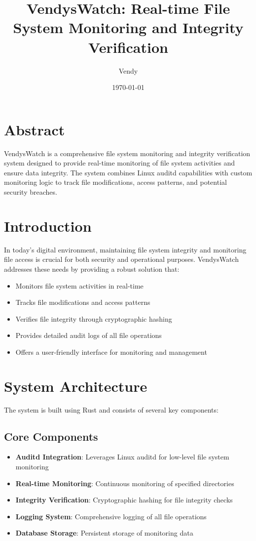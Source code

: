 \documentclass[12pt]{article}
\title{VendysWatch: Real-time File System Monitoring and Integrity Verification}
\author{Vendy}
\date{\today}
\begin{document}
\maketitle

\section{Abstract}
VendysWatch is a comprehensive file system monitoring and integrity verification system designed to provide real-time monitoring of file system activities and ensure data integrity. The system combines Linux auditd capabilities with custom monitoring logic to track file modifications, access patterns, and potential security breaches.

\section{Introduction}
In today's digital environment, maintaining file system integrity and monitoring file access is crucial for both security and operational purposes. VendysWatch addresses these needs by providing a robust solution that:

\begin{itemize}
    \item Monitors file system activities in real-time
    \item Tracks file modifications and access patterns
    \item Verifies file integrity through cryptographic hashing
    \item Provides detailed audit logs of all file operations
    \item Offers a user-friendly interface for monitoring and management
\end{itemize}

\section{System Architecture}
The system is built using Rust and consists of several key components:

\subsection{Core Components}
\begin{itemize}
    \item \textbf{Auditd Integration}: Leverages Linux auditd for low-level file system monitoring
    \item \textbf{Real-time Monitoring}: Continuous monitoring of specified directories
    \item \textbf{Integrity Verification}: Cryptographic hashing for file integrity checks
    \item \textbf{Logging System}: Comprehensive logging of all file operations
    \item \textbf{Database Storage}: Persistent storage of monitoring data
\end{itemize}
\end{document}
